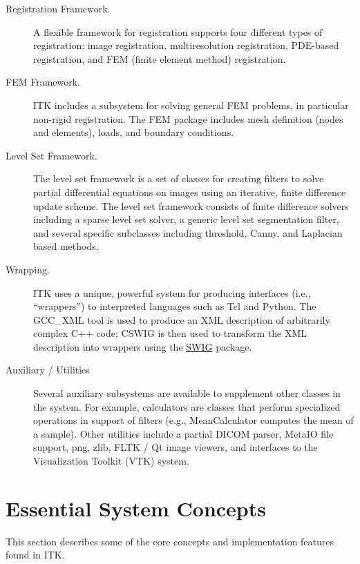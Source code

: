 \begin{description}
	\item[Registration Framework.] A flexible framework for registration
        supports four different types of registration: image registration,
        multiresolution registration, PDE-based registration, and FEM (finite
        element method) registration.

	\item[FEM Framework.] ITK includes a subsystem for solving general
        FEM problems, in particular non-rigid registration. The FEM package
        includes mesh definition (nodes and elements), loads, and boundary
        conditions.

	\item[Level Set Framework.] The level set framework is a set of
        classes for creating filters to solve partial differential equations
        on images using an iterative, finite difference update scheme. The
        level set framework consists of finite difference solvers including a
        sparse level set solver, a generic level set segmentation filter, and
        several specific subclasses including threshold, Canny, and Laplacian
        based methods.

	\item[Wrapping.] ITK uses a unique, powerful system for
	producing interfaces (i.e., ``wrappers'') to interpreted
	languages such as Tcl and Python. The GCC\_XML tool is used to
	produce an XML description of arbitrarily complex C++ code;
	CSWIG is then used to transform the XML description into
	wrappers using the \href{http://www.swig.org/}{SWIG} package.

	\item[Auxiliary / Utilities] Several auxiliary subsystems are 
        available to supplement other classes in the system. For example,
        calculators are classes that perform specialized operations in
        support of filters (e.g., MeanCalculator computes the mean of a
        sample). Other utilities include a partial DICOM parser, MetaIO file
        support, png, zlib, FLTK / Qt image viewers, and interfaces to the
        Visualization Toolkit (VTK) system.
        
\end{description}


\section{Essential System Concepts}
\label{sec:EssentialSystemConcepts}

This section describes some of the core concepts and implementation features
found in ITK.

